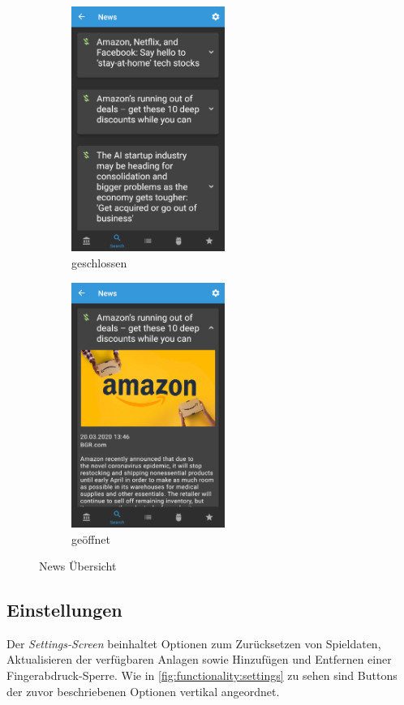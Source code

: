 \documentclass[a4paper]{article}
\begin{document}
\begin{figure}[H]
    \begin{subfigure}{.5\textwidth}
        \centering
        \includegraphics[height=8cm,keepaspectratio]{./images/news/news.png}
        \caption{geschlossen}
        \label{fig:functionality:news:closed}
    \end{subfigure}
    \begin{subfigure}{.5\textwidth}
        \centering
        \includegraphics[height=8cm,keepaspectratio]{./images/news/news_open.png}
        \caption{geöffnet}
        \label{fig:functionality:news:open}
    \end{subfigure}
    \caption{News Übersicht}
    \label{fig:functionality:news}
\end{figure}


\subsection{Einstellungen}
\label{subsec:functionality:settings}
Der \textit{Settings-Screen} beinhaltet Optionen zum Zurücksetzen von Spieldaten, Aktualisieren der verfügbaren Anlagen sowie Hinzufügen und Entfernen einer Fingerabdruck-Sperre.
Wie in \autoref{fig:functionality:settings} zu sehen sind Buttons der zuvor beschriebenen Optionen vertikal angeordnet.
\end{document}
